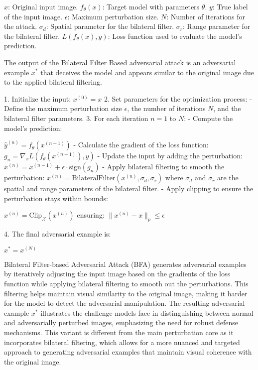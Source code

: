 $x$: Original input image.  
$f_{\theta}(x)$: Target model with parameters $\theta$.  
$y$: True label of the input image.  
$\epsilon$: Maximum perturbation size.  
$N$: Number of iterations for the attack.  
$\sigma_d$: Spatial parameter for the bilateral filter.  
$\sigma_r$: Range parameter for the bilateral filter.  
$L(f_{\theta}(x), y)$: Loss function used to evaluate the model's prediction.


The output of the Bilateral Filter Based adversarial attack is an adversarial example $x^*$ that deceives the model and appears similar to the original image due to the applied bilateral filtering.

1. Initialize the input:
   $x^{(0)} = x$
2. Set parameters for the optimization process:
   - Define the maximum perturbation size $\epsilon$, the number of iterations $N$, and the bilateral filter parameters.
3. For each iteration $n = 1$ to $N$:
   - Compute the model's prediction:
   
   $\hat{y}^{(n)} = f_{\theta}(x^{(n-1)})$
   - Calculate the gradient of the loss function:
   $g_n = \nabla_x L(f_{\theta}(x^{(n-1)}), y)$
   - Update the input by adding the perturbation:
   $x^{(n)} = x^{(n-1)} + \epsilon \cdot \text{sign}(g_n)$
   - Apply bilateral filtering to smooth the perturbation:
   $x^{(n)} = \text{BilateralFilter}(x^{(n)}, \sigma_d, \sigma_r)$
   where $\sigma_d$ and $\sigma_r$ are the spatial and range parameters of the bilateral filter.
   - Apply clipping to ensure the perturbation stays within bounds:
   
   $x^{(n)} = \text{Clip}_{\mathcal{X}}(x^{(n)})$
   ensuring:
   $\|x^{(n)} - x\|_p \leq \epsilon$

4. The final adversarial example is:
   
   $x^* = x^{(N)}$

Bilateral Filter-based Adversarial Attack (BFA) generates adversarial examples by iteratively adjusting the input image based on the gradients of the loss function while applying bilateral filtering to smooth out the perturbations. This filtering helps maintain visual similarity to the original image, making it harder for the model to detect the adversarial manipulation. The resulting adversarial example $x^*$ illustrates the challenge models face in distinguishing between normal and adversarially perturbed images, emphasizing the need for robust defense mechanisms. This variant is different from the main perturbation core as it incorporates bilateral filtering, which allows for a more nuanced and targeted approach to generating adversarial examples that maintain visual coherence with the original image.